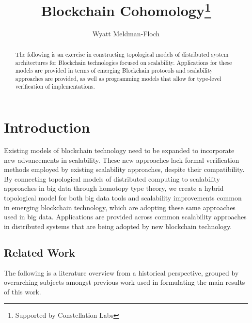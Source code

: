 \documentclass[runningheads]{llncs}
\begin{document}
%
\title{Blockchain Cohomology\thanks{Supported by Constellation Labs}}
%
%
\author{Wyatt Meldman-Floch }
%
%
%
\maketitle              %
%
\begin{abstract}
The following is an exercise in constructing topological models of distributed system architectures for Blockchain technologies focused on scalability. Applications for these models are provided in terms of emerging Blockchain protocols and scalability approaches are provided, as well as programming models that allow for type-level verification of implementations.
\end{abstract}
%
%
%
\section{Introduction} 
Existing models of blockchain technology need to be expanded to incorporate new advancements in scalability. These new approaches lack formal verification methods employed by existing scalability approaches, despite their compatibility. By connecting topological models of distributed computing to scalability approaches in big data through homotopy type theory, we create a hybrid topological model for both big data tools and scalability improvements common in emerging blockchain technology, which are adopting these same approaches used in big data. Applications are provided across common scalability approaches in distributed systems that are being adopted by new blockchain technology.

\subsection{Related Work}
The following is a literature overview from a historical perspective, grouped by overarching subjects amongst previous work used in formulating the main results of this work. 
\end{document}
